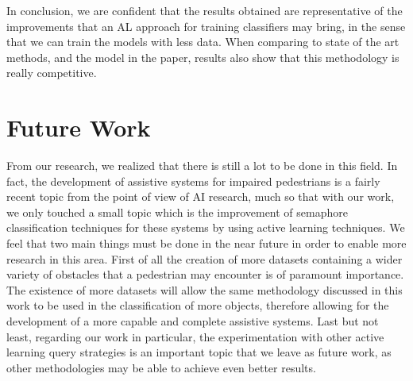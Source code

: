 \documentclass[journal, a4paper]{IEEEtran}
\begin{document}
In conclusion, we are confident that the results obtained are representative of the improvements
that an AL approach for training classifiers may bring, in the sense that we can train the
models with less data. When comparing to state of the art methods, and the model in the \cite{tan2021flying} paper, results also show that this methodology is really competitive.

\section{Future Work}

From our research, we realized that there is still a lot to be done in this field.
In fact, the development of assistive systems for impaired pedestrians is a fairly 
recent topic from the point of view of AI research, much so that with our work, we only 
touched a small topic which is the improvement of semaphore classification techniques 
for these systems by using active learning techniques. We feel that two main things must 
be done in the near future in order to enable more research in this area. First of all 
the creation of more datasets containing a wider variety of obstacles that a pedestrian may 
encounter is of paramount importance. The existence of more datasets will allow the 
same methodology discussed in this work to be used in the classification of more objects, 
therefore allowing for the development of a more capable and complete assistive systems. 
Last but not least, regarding our work in particular, the experimentation with other active 
learning query strategies is an important topic that we leave as future work, as other 
methodologies may be able to achieve even better results. 

\printbibliography
\end{document}
